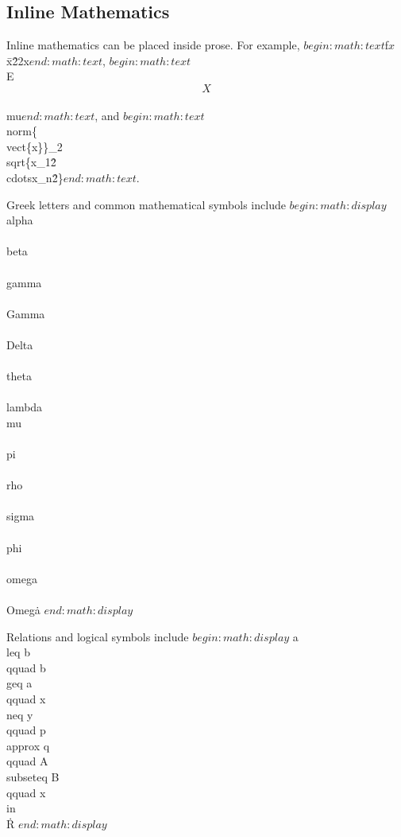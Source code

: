 \documentclass[10pt,a4paper,twocolumn]{article}
\theoremstyle{definition}
\theoremstyle{remark}
\newcommand{\R}{\mathbb{R}}
\newcommand{\E}{\mathbb{E}}
\newcommand{\norm}[1]{\left\lVert #1 \right\rVert}
\newcommand{\vect}[1]{\bm{#1}}
\begin{document}
\subsection{Inline Mathematics}

Inline mathematics can be placed inside prose. For example,
$begin:math:text$f\(x\)\=x\^2\+2x$end:math:text$,
$begin:math:text$\\E\[X\]\=\\mu$end:math:text$,
and
$begin:math:text$\\norm\{\\vect\{x\}\}\_2\=\\sqrt\{x\_1\^2\+\\cdots\+x\_n\^2\}$end:math:text$.

Greek letters and common mathematical symbols include
$begin:math:display$
  \\alpha\,\\ \\beta\,\\ \\gamma\,\\ \\Gamma\,\\ \\Delta\,\\ \\theta\,\\ \\lambda\,
  \\mu\,\\ \\pi\,\\ \\rho\,\\ \\sigma\,\\ \\phi\,\\ \\omega\,\\ \\Omega\.
$end:math:display$

Relations and logical symbols include
$begin:math:display$
  a\\leq b\,\\qquad
  b\\geq a\,\\qquad
  x\\neq y\,\\qquad
  p\\approx q\,\\qquad
  A\\subseteq B\,\\qquad
  x\\in\\R\.
$end:math:display$
\end{document}
